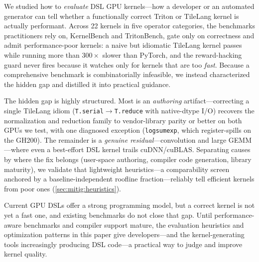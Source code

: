 We studied how to \emph{evaluate} DSL GPU kernels---how a developer or an automated generator can tell whether a functionally correct Triton or TileLang kernel is actually performant. Across 22 kernels in five operator categories, the benchmarks practitioners rely on, KernelBench and TritonBench, gate only on correctness and admit performance-poor kernels: a naive but idiomatic TileLang kernel passes while running more than $300\times$ slower than PyTorch, and the reward-hacking guard never fires because it watches only for kernels that are too \emph{fast}. Because a comprehensive benchmark is combinatorially infeasible, we instead characterized the hidden gap and distilled it into practical guidance.

The hidden gap is highly structured. Most is an \emph{authoring} artifact---correcting a single TileLang idiom (\texttt{T.serial}$\to$\texttt{T.reduce} with native-dtype I/O) recovers the normalization and reduction family to vendor-library parity or better on both GPUs we test, with one diagnosed exception (\texttt{logsumexp}, which register-spills on the GH200). The remainder is a \emph{genuine residual}---convolution and large GEMM---where even a best-effort DSL kernel trails cuDNN/cuBLAS. Separating causes by where the fix belongs (user-space authoring, compiler code generation, library maturity), we validate that lightweight heuristics---a comparability screen anchored by a baseline-independent roofline fraction---reliably tell efficient kernels from poor ones (\cref{sec:mitig:heuristics}).

Current GPU DSLs offer a strong programming model, but a correct kernel is not yet a fast one, and existing benchmarks do not close that gap. Until performance-aware benchmarks and compiler support mature, the evaluation heuristics and optimization patterns in this paper give developers---and the kernel-generating tools increasingly producing DSL code---a practical way to judge and improve kernel quality.